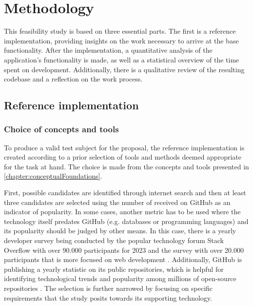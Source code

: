 \chapter{Methodology}
\label{chapter:methodology}

This feasibility study is based on three essential parts. The first is a reference implementation, providing insights on the work necessary to arrive at the base functionality. After the implementation, a quantitative analysis of the application's functionality is made, as well as a statistical overview of the time spent on development. Additionally, there is a qualitative review of the resulting codebase and a reflection on the work process.

\section{Reference implementation}

\subsection{Choice of concepts and tools}

To produce a valid test subject for the proposal, the reference implementation is created according to a prior selection of tools and methods deemed appropriate for the task at hand. The choice is made from the concepts and tools presented in \autoref{chapter:conceptualFoundations}.

First, possible candidates are identified through internet search and then at least three candidates are selected using the number of  received on GitHub as an indicator of popularity. In some cases, another metric has to be used where the technology itself predates GitHub (e.g. databases or programming languages) and its popularity should be judged by other means. In this case, there is a yearly developer survey being conducted by the popular technology forum Stack Overflow with over 90.000 participants for 2023 \parencite{stackOverflowPoll} and the  survey with over 20.000 participants that is more focused on web development \parencite{stateOfJSSurvey}. Additionally, GitHub is publishing a yearly statistic on its public repositories, which is helpful for identifying technological trends and popularity among millions of open-source repositories \parencite{stateOfTheOctoverse23}. The selection is further narrowed by focusing on specific requirements that the study posits towards its supporting technology.

